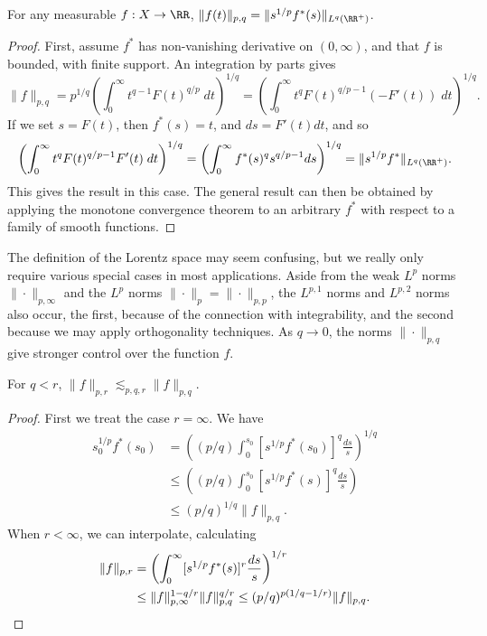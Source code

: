\begin{lemma}
  For any measurable $f: X \to \RR$, $\| f(t) \|_{p,q} = \| s^{1/p} f^*(s) \|_{L^q(\RR^+)}$.
\end{lemma}
\begin{proof}
  First, assume $f^*$ has non-vanishing derivative on $(0,\infty)$, and that $f$ is bounded, with finite support. An integration by parts gives
  \[ \| f \|_{p,q} = p^{1/q} \left( \int_0^\infty t^{q-1} F(t)^{q/p}\; dt \right)^{1/q} = \left( \int_0^\infty t^q F(t)^{q/p - 1} (-F'(t))\; dt \right)^{1/q}. \]
  If we set $s = F(t)$, then $f^*(s) = t$, and $ds = F'(t) dt$, and so
  \[ \left( \int_0^\infty t^q F(t)^{q/p - 1} F'(t)\; dt \right)^{1/q} = \left( \int_0^\infty f^*(s)^q s^{q/p - 1} ds \right)^{1/q} = \| s^{1/p} f^* \|_{L^q(\RR^+)}. \]
  This gives the result in this case. The general result can then be obtained by applying the monotone convergence theorem to an arbitrary $f^*$ with respect to a family of smooth functions.
\end{proof}

The definition of the Lorentz space may seem confusing, but we really only require various special cases in most applications. Aside from the weak $L^p$ norms $\| \cdot \|_{p,\infty}$ and the $L^p$ norms $\| \cdot \|_p = \| \cdot \|_{p,p}$, the $L^{p,1}$ norms and $L^{p,2}$ norms also occur, the first, because of the connection with integrability, and the second because we may apply orthogonality techniques. As $q \to 0$, the norms $\| \cdot \|_{p,q}$ give stronger control over the function $f$.

\begin{theorem}
    For $q < r$, $\| f \|_{p,r} \lesssim_{p,q,r} \| f \|_{p,q}$.
\end{theorem}
\begin{proof}
    First we treat the case $r = \infty$. We have
    \begin{align*}
        s_0^{1/p} f^*(s_0) &= \left( (p/q) \int_0^{s_0} [s^{1/p} f^*(s_0)]^q \frac{ds}{s} \right)^{1/q}\\
        &\leq \left( (p/q) \int_0^{s_0} [s^{1/p} f^*(s)]^q \frac{ds}{s} \right)\\
        &\leq (p/q)^{1/q} \| f \|_{p,q}.
    \end{align*}
    When $r < \infty$, we can interpolate, calculating
    \begin{align*}
      \| f \|_{p,r} &= \left( \int_0^\infty [s^{1/p} f^*(s)]^r \frac{ds}{s} \right)^{1/r}\\
    &\leq \| f \|_{p,\infty}^{1 - q/r} \| f \|_{p,q}^{q/r} \leq (p/q)^{p(1/q - 1/r)} \| f \|_{p,q}. \qedhere
    \end{align*}
\end{proof}

